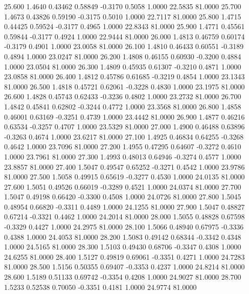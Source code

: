   25.600   1.4640   0.43462   0.58849  -0.3170   0.5058   1.0000  22.5835  81.0000
  25.700   1.4673   0.43826   0.59190  -0.3175   0.5010   1.0000  22.7117  81.0000
  25.800   1.4715   0.44425   0.59524  -0.3177   0.4965   1.0000  22.8343  81.0000
  25.900   1.4771   0.45561   0.59844  -0.3177   0.4924   1.0000  22.9444  81.0000
  26.000   1.4813   0.46759   0.60174  -0.3179   0.4901   1.0000  23.0058  81.0000
  26.100   1.4810   0.46433   0.60551  -0.3189   0.4894   1.0000  23.0247  81.0000
  26.200   1.4808   0.46155   0.60930  -0.3200   0.4884   1.0000  23.0504  81.0000
  26.300   1.4809   0.45935   0.61307  -0.3210   0.4871   1.0000  23.0858  81.0000
  26.400   1.4812   0.45786   0.61685  -0.3219   0.4854   1.0000  23.1343  81.0000
  26.500   1.4818   0.45721   0.62061  -0.3228   0.4830   1.0000  23.1975  81.0000
  26.600   1.4828   0.45743   0.62433  -0.3236   0.4802   1.0000  23.2732  81.0000
  26.700   1.4842   0.45841   0.62802  -0.3244   0.4772   1.0000  23.3568  81.0000
  26.800   1.4858   0.46001   0.63169  -0.3251   0.4739   1.0000  23.4442  81.0000
  26.900   1.4877   0.46216   0.63534  -0.3257   0.4707   1.0000  23.5329  81.0000
  27.000   1.4900   0.46488   0.63896  -0.3263   0.4674   1.0000  23.6217  81.0000
  27.100   1.4925   0.46834   0.64255  -0.3268   0.4642   1.0000  23.7096  81.0000
  27.200   1.4955   0.47295   0.64607  -0.3272   0.4610   1.0000  23.7961  81.0000
  27.300   1.4993   0.48013   0.64946  -0.3274   0.4577   1.0000  23.8857  81.0000
  27.400   1.5047   0.49547   0.65252  -0.3271   0.4542   1.0000  23.9786  81.0000
  27.500   1.5058   0.49915   0.65619  -0.3277   0.4530   1.0000  24.0135  81.0000
  27.600   1.5051   0.49526   0.66019  -0.3289   0.4521   1.0000  24.0374  81.0000
  27.700   1.5047   0.49198   0.66420  -0.3300   0.4508   1.0000  24.0726  81.0000
  27.800   1.5045   0.48954   0.66820  -0.3311   0.4489   1.0000  24.1255  81.0000
  27.900   1.5047   0.48827   0.67214  -0.3321   0.4462   1.0000  24.2014  81.0000
  28.000   1.5055   0.48828   0.67598  -0.3329   0.4427   1.0000  24.2975  81.0000
  28.100   1.5066   0.48940   0.67975  -0.3336   0.4388   1.0000  24.4053  81.0000
  28.200   1.5083   0.49142   0.68344  -0.3342   0.4348   1.0000  24.5165  81.0000
  28.300   1.5103   0.49430   0.68706  -0.3347   0.4308   1.0000  24.6255  81.0000
  28.400   1.5127   0.49819   0.69061  -0.3351   0.4271   1.0000  24.7283  81.0000
  28.500   1.5156   0.50355   0.69407  -0.3353   0.4237   1.0000  24.8214  81.0000
  28.600   1.5189   0.51133   0.69742  -0.3354   0.4208   1.0000  24.9027  81.0000
  28.700   1.5233   0.52538   0.70050  -0.3351   0.4181   1.0000  24.9774  81.0000
